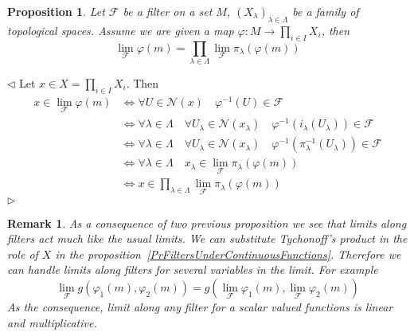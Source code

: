 \documentclass[12pt]{article}
\newtheorem{proposition}[theorem]{Proposition}
\newtheorem{remark}[theorem]{Remark}
\newenvironment{proof}{\par $\triangleleft$}{$\triangleright$}
\begin{document}
\begin{proposition}\label{PrTopProdAndFilters} Let $\mathcal{F}$ be a filter on
    a set $M$, ${(X_\lambda)}_{\lambda\in \Lambda}$ be a family of topological
    spaces. Assume we are given a map $\varphi:M\to \prod_{i\in I}X_i$, then
    $$
        \lim_{\mathcal{F}}\varphi(m)=\prod_{\lambda\in\Lambda}\lim_{\mathcal{F}}\pi_\lambda(\varphi(m))
    $$
\end{proposition}
\begin{proof} Let $x\in X=\prod_{i\in I}X_i$. Then
    $$
        \begin{aligned}
            x\in \lim_{\mathcal{F}}\varphi(m)
             & \Longleftrightarrow
            \forall U\in\mathcal{N}(x)\quad\varphi^{-1}(U)\in\mathcal{F}                                                                         \\
             & \Longleftrightarrow
            \forall \lambda\in\Lambda\quad\forall U_\lambda\in\mathcal{N}(x_\lambda)\quad\varphi^{-1}(i_\lambda(U_\lambda))\in\mathcal{F}        \\
             & \Longleftrightarrow
            \forall \lambda\in\Lambda\quad\forall U_\lambda\in\mathcal{N}(x_\lambda)\quad\varphi^{-1}(\pi^{-1}_\lambda(U_\lambda))\in\mathcal{F} \\
             & \Longleftrightarrow
            \forall \lambda\in\Lambda\quad x_\lambda\in\lim_{\mathcal{F}}\pi_\lambda(\varphi(m))                                                 \\
             & \Longleftrightarrow
            x\in\prod_{\lambda\in\Lambda}\lim_{\mathcal{F}}\pi_\lambda(\varphi(m))
        \end{aligned}
    $$
\end{proof}

\begin{remark}\label{RemBasicPropertiesOfLimitsAlngFilters} As a consequence of
    two previous proposition we see that limits along filters act much like the
    usual limits. We can substitute Tychonoff's product in the role of $X$ in
    the proposition~\ref{PrFiltersUnderContinuousFunctions}. Therefore we can
    handle limits along filters for several variables in the limit. For example
    $$
        \lim_{\mathcal{F}}g(\varphi_1(m), \varphi_2(m))
        =g(\lim_{\mathcal{F}}\varphi_1(m), \lim_{\mathcal{F}}\varphi_2(m))
    $$
    As the consequence, limit along any filter for a scalar valued functions is
    linear and multiplicative.
\end{remark}
\end{document}
